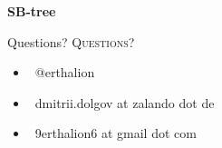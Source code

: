 \documentclass[usenames,dvipsnames, 18pt, compress, aspectratio=169]{beamer}
\def\twitter{{\FA \faTwitter}}
\def\email{{\FA \faEnvelope}}
\begin{document}
\begin{frame}[fragile]{}
    \frametitle{}

    \begin{center}
    \textbf{SB-tree}
    \vspace{1cm}

    \begin{overprint}[8cm]
    \end{overprint}

    \end{center}
\end{frame}

\fontsize{18pt}{18}\selectfont
\begin{frame}
  \vspace*{2.5cm}
  \begin{minipage}[b][\paperheight]{\textwidth}
  \begin{center}

      \linespread{1.0}%
      \if@noSmallCapitals%
        Questions?
      \else%
        \scshape{\color{black} Questions?}%
      \fi%
      \vspace*{0.3em}

      \fontsize{13pt}{14}\selectfont
        \begin{itemize}[label={}]
            \item {\color{black} \twitter\ @erthalion}
            \item {\color{black} \email\ dmitrii.dolgov at zalando dot de}
            \item {\color{black} \email\ 9erthalion6 at gmail dot com}
        \end{itemize}
      \vspace*{2.5em}%

    \vfill
    \vspace*{2em}
  \end{center}
  \end{minipage}

\end{frame}
\end{document}
